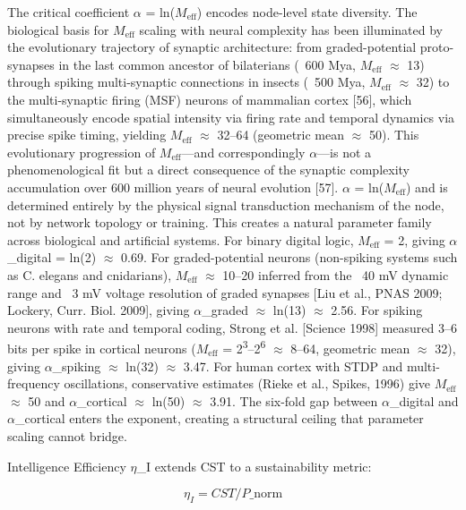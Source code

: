 \documentclass[a4paper,12pt]{article}
\begin{document}
The critical coefficient $\alpha$ = ln($M_{\text{eff}}$) encodes node-level state diversity.
The biological basis for $M_{\text{eff}}$ scaling with neural complexity has been illuminated by the evolutionary trajectory of synaptic architecture: from graded-potential proto-synapses in the last common ancestor of bilaterians (~600 Mya, $M_{\text{eff}}$ $\approx$ 13) through spiking multi-synaptic connections in insects (~500 Mya, $M_{\text{eff}}$ $\approx$ 32) to the multi-synaptic firing
(MSF) neurons of mammalian cortex [56], which simultaneously encode spatial intensity via firing rate and temporal dynamics via precise spike timing, yielding $M_{\text{eff}}$ $\approx$ 32--64 (geometric mean $\approx$ 50).
This evolutionary progression of $M_{\text{eff}}$---and correspondingly $\alpha$---is not a phenomenological fit but a direct consequence of the synaptic complexity accumulation over 600 million years of neural evolution [57]. $\alpha$ = ln($M_{\text{eff}}$) and is determined entirely by the physical signal transduction mechanism of the node, not by network topology or training.
This creates a natural parameter family across biological and artificial systems.
For binary digital logic, $M_{\text{eff}}$ = 2, giving $\alpha$_digital = ln(2) $\approx$ 0.69.
For graded-potential neurons (non-spiking systems such as C. elegans and cnidarians), $M_{\text{eff}}$ $\approx$ 10--20 inferred from the ~40 mV dynamic range and ~3 mV voltage resolution of graded synapses [Liu et al., PNAS 2009; Lockery, Curr.
Biol. 2009], giving $\alpha$_graded $\approx$ ln(13) $\approx$ 2.56.
For spiking neurons with rate and temporal coding, Strong et al. [Science 1998] measured 3--6 bits per spike in cortical neurons ($M_{\text{eff}}$ = 2\textsuperscript{3}--2\textsuperscript{6} $\approx$ 8--64, geometric mean $\approx$ 32), giving $\alpha$_spiking $\approx$ ln(32) $\approx$ 3.47.
For human cortex with STDP and multi-frequency oscillations, conservative estimates (Rieke et al., Spikes, 1996) give $M_{\text{eff}}$ $\approx$ 50 and $\alpha$_cortical $\approx$ ln(50) $\approx$ 3.91.
The six-fold gap between $\alpha$_digital and $\alpha$_cortical enters the exponent, creating a structural ceiling that parameter scaling cannot bridge.


Intelligence Efficiency $\eta$_I extends CST to a sustainability metric:


\begin{equation}

\eta_I = CST / P\_{\text{norm}} \tag{5}

\end{equation}
\end{document}
